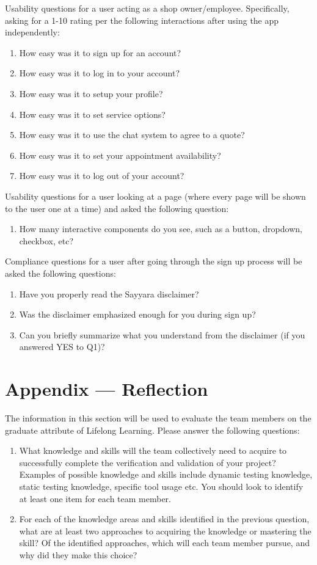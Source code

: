 \documentclass[12pt, titlepage]{article}
\begin{document}
Usability questions for a user acting as a shop owner/employee. Specifically, asking for a 1-10 rating per the following interactions after using the app independently:
\begin{enumerate}
    \item How easy was it to sign up for an account?
    \item How easy was it to log in to your account?
    \item How easy was it to setup your profile?
    \item How easy was it to set service options?
    \item How easy was it to use the chat system to agree to a quote?
    \item How easy was it to set your appointment availability?
    \item How easy was it to log out of your account?
\end{enumerate}

Usability questions for a user looking at a page (where every page will be shown to the user one at a time) and asked the following question:
\begin{enumerate}
    \item How many interactive components do you see, such as a button, dropdown, checkbox, etc?
\end{enumerate}

Compliance questions for a user after going through the sign up process will be asked the following questions:
\begin{enumerate}
    \item Have you properly read the Sayyara disclaimer?
    \item Was the disclaimer emphasized enough for you during sign up?
    \item Can you briefly summarize what you understand from the disclaimer (if you answered YES to Q1)?
\end{enumerate}

\newpage{}
\section*{Appendix --- Reflection}

The information in this section will be used to evaluate the team members on the
graduate attribute of Lifelong Learning.  Please answer the following questions:

\begin{enumerate}
  \item What knowledge and skills will the team collectively need to acquire to
  successfully complete the verification and validation of your project?
  Examples of possible knowledge and skills include dynamic testing knowledge,
  static testing knowledge, specific tool usage etc.  You should look to
  identify at least one item for each team member.
  \item For each of the knowledge areas and skills identified in the previous
  question, what are at least two approaches to acquiring the knowledge or
  mastering the skill?  Of the identified approaches, which will each team
  member pursue, and why did they make this choice?
\end{enumerate}
\end{document}
